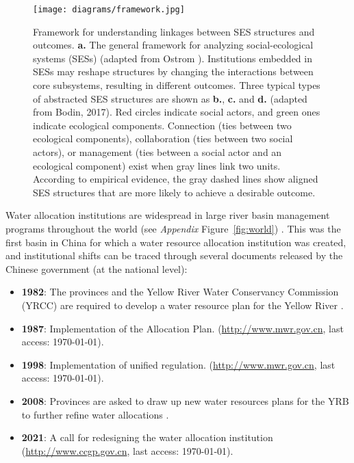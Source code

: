 \documentclass[default, sn-standardnature]{sn-jnl}
\begin{document}
\begin{figure}[!bh]
	\centering
	\texttt{[image: diagrams/framework.jpg]}
	\caption{
		Framework for understanding linkages between SES structures and outcomes.
		\textbf{a.} The general framework for analyzing social-ecological systems (SESs) (adapted from Ostrom \cite{ostrom2009}). Institutions embedded in SESs may reshape structures by changing the interactions between core subsystems, resulting in different outcomes.
        Three typical types of abstracted SES structures are shown as \textbf{b.}, \textbf{c.} and \textbf{d.} (adapted from Bodin, 2017)\cite{bodin2017b}. Red circles indicate social actors, and green ones indicate ecological components. Connection (ties between two ecological components), collaboration (ties between two social actors), or management (ties between a social actor and an ecological component) exist when gray lines link two units. According to empirical evidence, the gray dashed lines show aligned SES structures that are more likely to achieve a desirable outcome.
        }
    \label{framework}
\end{figure}

Water allocation institutions are widespread in large river basin management programs throughout the world (see \textit{Appendix} Figure~\ref{fig:world}) \cite{speed2013}.
This was the first basin in China for which a water resource allocation institution was created, and institutional shifts can be traced through several documents released by the Chinese government (at the national level)\cite{wang2019a}:
\begin{itemize}
    \item \textbf{1982}: The provinces and the Yellow River Water Conservancy Commission (YRCC) are required to develop a water resource plan for the Yellow River \cite{wang2019, wang2019a}.
    \item \textbf{1987}: Implementation of the Allocation Plan. (\href{http://www.gov.cn/zhengce/content/2011-03/30/content_3138.htm#}{http://www.mwr.gov.cn}, last access: \today).
    \item \textbf{1998}: Implementation of unified regulation. (\href{http://www.mwr.gov.cn/ztpd/2013ztbd/2013fxkh/fxkhswcbcs/cs/flfg/201304/t20130411_433489.html}{http://www.mwr.gov.cn}, last access: \today).
    \item \textbf{2008}: Provinces are asked to draw up new water resources plans for the YRB to further refine water allocations \cite{wang2019,wang2019a}.
    \item \textbf{2021}: A call for redesigning the water allocation institution (\href{http://www.ccgp.gov.cn/cggg/zygg/gkzb/202107/t20210721_16591901.htm}{http://www.ccgp.gov.cn}, last access: \today).
\end{itemize}
\end{document}
